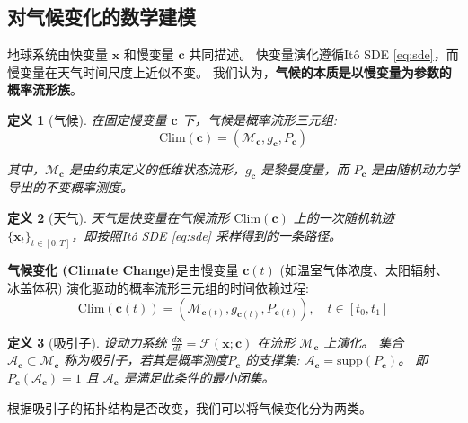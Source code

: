\documentclass[12pt, a4paper]{article}
\newtheorem{definition}{定义}[section]
\newcommand{\manifold}{\mathcal{M}}
\newcommand{\metric}{g}
\newcommand{\measure}{P}
\newcommand{\attractor}{\mathcal{A}}
\newcommand{\fastvar}{\bm{x}}          %
\newcommand{\slowvar}{\bm{c}}          %
\newcommand{\drift}{\mathcal{F}}  %
\begin{document}
\subsection{对气候变化的数学建模}

地球系统由快变量 $\fastvar$ 和慢变量 $\slowvar$ 共同描述。
快变量演化遵循Itô SDE \eqref{eq:sde}，而慢变量在天气时间尺度上近似不变。
我们认为，\textbf{气候的本质是以慢变量为参数的概率流形族}。

\begin{definition}[气候]
\label{def:climate}
    在固定慢变量 $\slowvar$ 下，气候是概率流形三元组:
    \begin{equation}
    \label{eq:climate_triple}
        \mathrm{Clim}(\slowvar) = (\manifold_{\slowvar}, \metric_{\slowvar}, \measure_{\slowvar})
    \end{equation}

    其中，$\manifold_{\slowvar}$ 是由约束定义的低维状态流形，$\metric_{\slowvar}$ 是黎曼度量，而 $\measure_{\slowvar}$ 是由随机动力学导出的不变概率测度。
\end{definition}

\begin{definition}[天气]
\label{def:weather}
    天气是快变量在气候流形 $\mathrm{Clim}(\slowvar)$ 上的一次随机轨迹 $\{\fastvar_t\}_{t \in [0, T]}$，即按照Itô SDE \eqref{eq:sde} 采样得到的一条路径。
\end{definition}

\textbf{气候变化 (Climate Change)}是由慢变量 $\slowvar(t)$ (如温室气体浓度、太阳辐射、冰盖体积) 演化驱动的概率流形三元组的时间依赖过程:
\begin{equation}
\label{eq:climate_change_evolution}
    \mathrm{Clim}(\slowvar(t)) = (\manifold_{\slowvar(t)}, \metric_{\slowvar(t)}, \measure_{\slowvar(t)}), \quad t \in [t_0, t_1]
\end{equation}

\begin{definition}[吸引子]
\label{def:attractor}
    设动力系统 $\frac{d\fastvar}{dt} = \drift(\fastvar; \slowvar)$ 在流形 $\manifold_{\slowvar}$ 上演化。
    集合 $\attractor_{\slowvar} \subset \manifold_{\slowvar}$ 称为吸引子，若其是概率测度$\measure_{\slowvar}$ 的支撑集: $\attractor_{\slowvar} = \mathrm{supp}(\measure_{\slowvar})$。
    即 $\measure_{\slowvar}(\attractor_{\slowvar}) = 1$ 且 $\attractor_{\slowvar}$ 是满足此条件的最小闭集。
\end{definition}

根据吸引子的拓扑结构是否改变，我们可以将气候变化分为两类。
\end{document}
